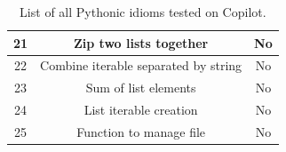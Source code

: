 \begin{table}[hbt!]
\begin{tabular}{|c|c|c|}
         \hline
         21 & Zip two lists together & No \\
         \hline
         22 & Combine iterable separated by string & No \\
         \hline
         23 & Sum of list elements & No \\
         \hline
         24 & List iterable creation & No \\
         \hline
         25 & Function to manage file & No \\
         \hline
    \end{tabular}
    \caption{List of all Pythonic idioms tested on Copilot.}
    \label{tab:all_idioms}
\end{table}